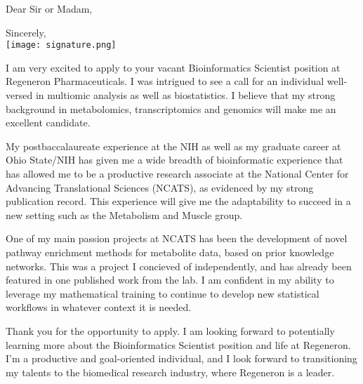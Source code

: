 \documentclass[11pt,a4paper,sans]{moderncv}        %
\begin{document}
\date{October 28th, 2020}
\opening{Dear Sir or Madam,}
\closing{Sincerely,\\ \vspace{.1cm} \texttt{[image: signature.png]} \vspace{-1cm} }
\makelettertitle

I am very excited to apply to your vacant Bioinformatics Scientist
position at Regeneron Pharmaceuticals. I was intrigued to see a call
for an individual well-versed in multiomic analysis as well as
biostatistics. I believe that my strong background in metabolomics,
transcriptomics and genomics will make me an excellent candidate.

My postbaccalaureate experience at the NIH as well as my graduate
career at Ohio State/NIH has given me a wide breadth of bioinformatic
experience that has allowed me to be a productive research associate
at the National Center for Advancing Translational Sciences (NCATS), as
evidenced by my strong publication record. This experience will give
me the adaptability to succeed in a new setting such as the Metabolism
and Muscle group.

One of my main passion projects at NCATS has been the development of
novel pathway enrichment methods for metabolite data, based on prior
knowledge networks. This was a project I concieved of independently,
and has already been featured in one published work from the lab. I am
confident in my ability to leverage my mathematical training to
continue to develop new statistical workflows in whatever context it
is needed.

Thank you for the opportunity to apply. I am looking forward to
potentially learning more about the Bioinformatics Scientist position
and life at Regeneron. I'm a productive and goal-oriented individual,
and I look forward to transitioning my talents to the biomedical
research industry, where Regeneron is a leader.

\makeletterclosing

\end{document}
